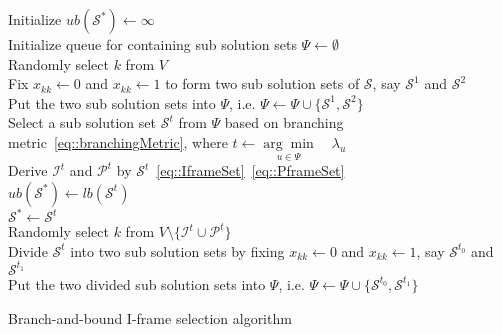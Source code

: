 \begin{algorithm}[]
 \SetAlgoLined
 \BlankLine
 Initialize $ub(\mathcal{S}^*) \gets \infty$ \\
 Initialize queue for containing sub solution sets $\Psi \gets \emptyset$ \\
 Randomly select $k$ from $V$ \\
 Fix $x_{kk} \gets 0$ and $x_{kk} \gets 1$ to form two sub solution sets of $\mathcal{S}$, say $\mathcal{S}^1$ and $\mathcal{S}^2$ \\
 Put the two sub solution sets into $\Psi$, i.e. $\Psi \gets \Psi \cup \{\mathcal{S}^1, \mathcal{S}^2\}$ \\
 \While{$\Psi \neq \emptyset$}
 {
 	Select a sub solution set $\mathcal{S}^t$ from $\Psi$ based on branching metric~\eqref{eq::branchingMetric}, where $t \gets \underset{u \in \Psi}{\arg \min} \quad \lambda_u$ \\
 	Derive $\mathcal{I}^t$ and $\mathcal{P}^t$ by $\mathcal{S}^t$~\eqref{eq::IframeSet}~\eqref{eq::PframeSet} \\
  	{
  		{
  			$ub(\mathcal{S}^*) \gets lb(\mathcal{S}^t)$ \\
  			$\mathcal{S}^* \gets \mathcal{S}^t$ \\
  		}
 	}
 	{	
 		{
 			Randomly select $k$ from $V \setminus \{\mathcal{I}^t \cup \mathcal{P}^t\}$ \\
 			Divide $\mathcal{S}^t$ into two sub solution sets by fixing $x_{kk} \gets 0$ and $x_{kk} \gets 1$, say $\mathcal{S}^{t_0}$ and $\mathcal{S}^{t_1}$ \\
 			Put the two divided sub solution sets into $\Psi$, i.e. $\Psi \gets \Psi \cup \{\mathcal{S}^{t_0}, \mathcal{S}^{t_1}\}$\\
 		}
 	}
 }
 \caption{\label{alg::bbAlgorithm}Branch-and-bound I-frame selection algorithm}
\end{algorithm}
\DecMargin{1em}
%
%
